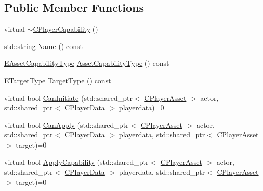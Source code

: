 \subsection*{Public Member Functions}
\begin{DoxyCompactItemize}
\item 
virtual \hyperlink{classCPlayerCapability_afd26c4ec0dd3f55ef316e90aa0648be1}{$\sim$\+C\+Player\+Capability} ()
\item 
std\+::string \hyperlink{classCPlayerCapability_a596925849a8c1f887919d57e50132782}{Name} () const
\item 
\hyperlink{GameDataTypes_8h_a35b98ce26aca678b03c6f9f76e4778ce}{E\+Asset\+Capability\+Type} \hyperlink{classCPlayerCapability_a433bb196cd6ab6a932f1cac102b3aa98}{Asset\+Capability\+Type} () const
\item 
\hyperlink{classCPlayerCapability_a9d3450ed1532fd536bd6cbb1e2eef02f}{E\+Target\+Type} \hyperlink{classCPlayerCapability_a022d6efcdc0897253d7c2e33ade0851d}{Target\+Type} () const
\item 
virtual bool \hyperlink{classCPlayerCapability_aa83b1e1fcaff2985c378132d679154ea}{Can\+Initiate} (std\+::shared\+\_\+ptr$<$ \hyperlink{classCPlayerAsset}{C\+Player\+Asset} $>$ actor, std\+::shared\+\_\+ptr$<$ \hyperlink{classCPlayerData}{C\+Player\+Data} $>$ playerdata)=0
\item 
virtual bool \hyperlink{classCPlayerCapability_ae96263e0950f496492f8baeb877b9554}{Can\+Apply} (std\+::shared\+\_\+ptr$<$ \hyperlink{classCPlayerAsset}{C\+Player\+Asset} $>$ actor, std\+::shared\+\_\+ptr$<$ \hyperlink{classCPlayerData}{C\+Player\+Data} $>$ playerdata, std\+::shared\+\_\+ptr$<$ \hyperlink{classCPlayerAsset}{C\+Player\+Asset} $>$ target)=0
\item 
virtual bool \hyperlink{classCPlayerCapability_a2ca6fd7fbd9c0178f1cf1d049c63825f}{Apply\+Capability} (std\+::shared\+\_\+ptr$<$ \hyperlink{classCPlayerAsset}{C\+Player\+Asset} $>$ actor, std\+::shared\+\_\+ptr$<$ \hyperlink{classCPlayerData}{C\+Player\+Data} $>$ playerdata, std\+::shared\+\_\+ptr$<$ \hyperlink{classCPlayerAsset}{C\+Player\+Asset} $>$ target)=0
\end{DoxyCompactItemize}
